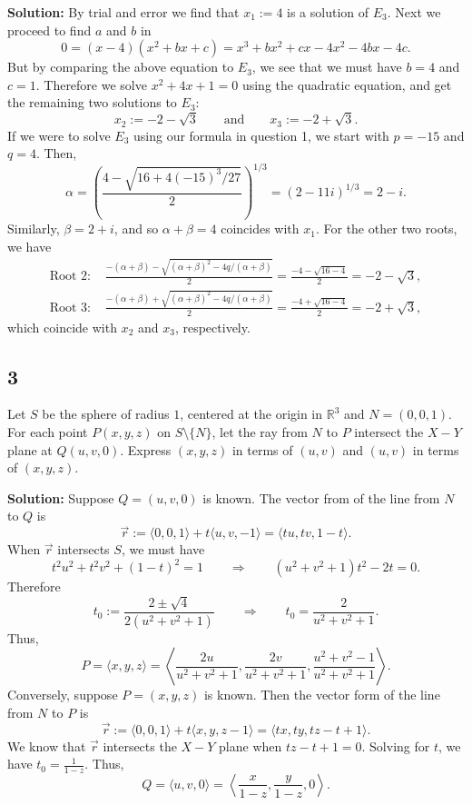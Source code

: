 \documentclass[12pt]{article}
\begin{document}
{\bf Solution:} By trial and error we find that $x_{1} := 4$ is a solution of $E_{3}$. Next we proceed to find $a$ and $b$ in 
\[ 0 = (x - 4)(x^{2} + bx + c) = x^{3} + bx^{2} + cx - 4x^{2} - 4bx - 4c. \]
But by comparing the above equation to $E_{3}$, we see that we must have $b = 4$ and $c = 1$. Therefore we solve $x^{2} + 4x + 1 = 0$ using the
quadratic equation, and get the remaining two solutions to $E_{3}$:
\[ x_{2} := -2 - \sqrt{3} \qquad \text{and} \qquad x_{3} := -2 + \sqrt{3}. \]
If we were to solve $E_{3}$ using our formula in question 1, we start with $p = -15$ and $q = 4$. Then,
\[ \alpha = \left( \frac{4 - \sqrt{16 + 4(-15)^{3}/27}}{2} \right)^{1/3} = (2 - 11i)^{1/3} = 2 - i. \]
Similarly, $\beta = 2 + i$, and so $\alpha + \beta = 4$ coincides with $x_{1}$. For the other two roots, we have 
\begin{align*}
\text{Root 2: } & \frac{-(\alpha + \beta) - \sqrt{(\alpha+\beta)^{2} - 4q/(\alpha+\beta)}}{2} = \frac{-4 - \sqrt{16 - 4}}{2} = -2 - \sqrt{3}, \\
\text{Root 3: } & \frac{-(\alpha + \beta) + \sqrt{(\alpha+\beta)^{2} - 4q/(\alpha+\beta)}}{2} = \frac{-4 + \sqrt{16 - 4}}{2} = -2 + \sqrt{3},
\end{align*}
which coincide with $x_{2}$ and $x_{3}$, respectively.








\subsection*{3}
Let $S$ be the sphere of radius $1$, centered at the origin in $\mathbb{R}^{3}$ and $N = (0,0,1)$. For each point $P(x,y,z)$ on $S\setminus \{N\}$,
let the ray from $N$ to $P$ intersect the $X-Y$ plane at $Q(u,v,0)$. Express $(x,y,z)$ in terms of $(u,v)$ and $(u,v)$ in terms of $(x,y,z)$.

{\bf Solution:} Suppose $Q = (u,v,0)$ is known. The vector from of the line from $N$ to $Q$ is 
\[ \vec{r} := \langle 0,0,1\rangle + t\langle u,v,-1\rangle = \langle tu, tv, 1-t\rangle. \]
When $\vec{r}$ intersects $S$, we must have 
\[ t^{2}u^{2} + t^{2}v^{2} + (1-t)^{2} = 1 \qquad \Rightarrow \qquad (u^{2} + v^{2} + 1)t^{2} - 2t = 0. \]
Therefore
\[ t_{0} := \frac{2\pm \sqrt{4}}{2(u^{2} + v^{2} + 1)} \qquad \Rightarrow \qquad t_{0} = \frac{2}{u^{2} + v^{2} + 1}. \]
Thus,
\[ P = \langle x,y,z \rangle = \left\langle \frac{2u}{u^{2} + v^{2} + 1}, \frac{2v}{u^{2} + v^{2} + 1}, \frac{u^{2} + v^{2} - 1}{u^{2} + v^{2} + 1}\right\rangle.
\]
Conversely, suppose $P = (x,y,z)$ is known. Then the vector form of the line from $N$ to $P$ is 
\[ \vec{r} := \langle 0,0,1 \rangle + t\langle x,y,z-1 \rangle = \langle tx,ty,tz-t+1\rangle. \]
We know that $\vec{r}$ intersects the $X-Y$ plane when $tz - t + 1 = 0$. Solving for $t$, we have $t_{0} = \frac{1}{1-z}$. Thus,
\[ Q = \langle u,v,0 \rangle = \left\langle \frac{x}{1-z}, \frac{y}{1-z}, 0 \right\rangle. \]
\end{document}
